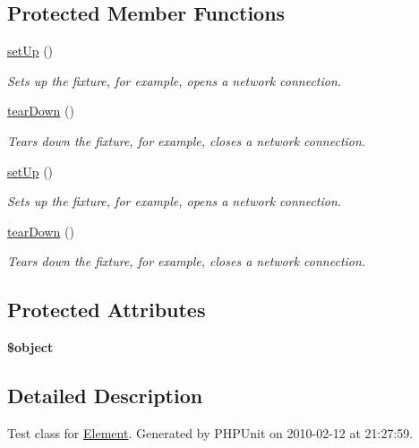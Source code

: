 \subsection*{Protected Member Functions}
\begin{DoxyCompactItemize}
\item 
\hyperlink{class_element_test_ad52aa067a65fbd62ec3c4f0117fbd3c1}{setUp} ()
\begin{DoxyCompactList}\small\item\em Sets up the fixture, for example, opens a network connection. \item\end{DoxyCompactList}\item 
\hyperlink{class_element_test_a729f28e4bdff35d6dfaea891cffe3663}{tearDown} ()
\begin{DoxyCompactList}\small\item\em Tears down the fixture, for example, closes a network connection. \item\end{DoxyCompactList}\item 
\hyperlink{class_element_test_ad52aa067a65fbd62ec3c4f0117fbd3c1}{setUp} ()
\begin{DoxyCompactList}\small\item\em Sets up the fixture, for example, opens a network connection. \item\end{DoxyCompactList}\item 
\hyperlink{class_element_test_a729f28e4bdff35d6dfaea891cffe3663}{tearDown} ()
\begin{DoxyCompactList}\small\item\em Tears down the fixture, for example, closes a network connection. \item\end{DoxyCompactList}\end{DoxyCompactItemize}
\subsection*{Protected Attributes}
\begin{DoxyCompactItemize}
\item 
\hypertarget{class_element_test_aabdb5e4a582b02871db91c6aa44481f8}{
{\bfseries \$object}}
\label{class_element_test_aabdb5e4a582b02871db91c6aa44481f8}

\end{DoxyCompactItemize}


\subsection{Detailed Description}
Test class for \hyperlink{class_element}{Element}. Generated by PHPUnit on 2010-\/02-\/12 at 21:27:59.

